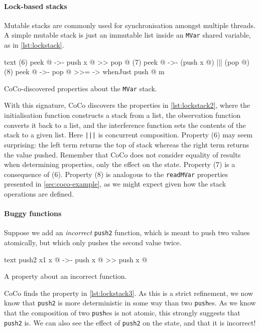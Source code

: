 \paragraph{Lock-based stacks}
Mutable stacks are commonly used for synchronisation amongst multiple
threads.  A simple mutable stack is just an immutable list inside an
\verb|MVar| shared variable, as in \cref{lst:lockstack}.

\begin{listing}
\centering
\begin{cminted}{text}
(6)  peek @  ->-  push x @ >> pop @
(7)  peek @  ->-  (push x @) ||| (pop @)
(8)  peek @  ->-  pop @ >>= \m -> whenJust push @ m
\end{cminted}
\caption{CoCo-discovered properties about the \texttt{MVar} stack.}\label{lst:lockstack2}
\end{listing}

With this signature, CoCo discovers the properties in
\cref{lst:lockstack2}, where the initialisation function constructs a
stack from a list, the observation function converts it back to a
list, and the interference function sets the contents of the stack to
a given list.  Here \verb#|||# is concurrent composition.  Property
(6) may seem surprising: the left term returns the top of stack
whereas the right term returns the value pushed.  Remember that CoCo
does not consider equality of results when determining properties,
only the effect on the state.  Property (7) is a consequence of (6).
Property (8) is analogous to the \verb|readMVar| properties presented
in \cref{sec:coco-example}, as we might expect given how the stack
operations are defined.

\paragraph{Buggy functions}
Suppose we add an \emph{incorrect} \verb|push2| function, which is
meant to push two values atomically, but which only pushes the second
value twice.

\begin{listing}
\centering
\begin{cminted}{text}
push2 x1 x @  ->-  push x @ >> push x @
\end{cminted}
\caption{A property about an incorrect function.}\label{lst:lockstack3}
\end{listing}

CoCo finds the property in \cref{lst:lockstack3}.  As this is a strict
refinement, we now know that \verb|push2| is more deterministic in
some way than two \verb|push|es.  As we know that the composition of
two \verb|push|es is not atomic, this strongly suggests that
\verb|push2| is.  We can also see the effect of \verb|push2| on the
state, and that it is incorrect!


